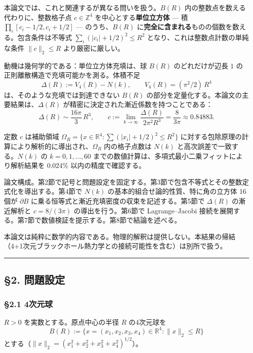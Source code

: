 \documentclass[a4paper,11pt]{ltjsarticle}
\theoremstyle{definition}
\begin{document}
本論文では、これと関連するが異なる問いを扱う。\(B(R)\)
内の整数点を数える代わりに、整数格子点 \(c \in \mathbb{Z}^4\)
を中心とする\textbf{単位立方体} --- 積
\(\prod_i [c_i - 1/2, c_i + 1/2]\) --- のうち、\(B(R)\)
に\textbf{完全に含まれる}ものの個数を数える。包含条件は不等式
\(\sum_i (|c_i| + 1/2)^2 \le R^2\) となり、これは整数点計数の単純な条件
\(\|c\|_2 \le R\) より厳密に厳しい。

動機は幾何学的である：単位立方体充填は、球 \(B(R)\) のどれだけが辺長
\(1\) の正則離散構造で充填可能かを測る。体積不足
\[\Delta(R) := V_4(R) - N(k), \qquad V_4(R) = (\pi^2/2)\,R^4\]
は、そのような充填では到達できない \(B(R)\)
の部分を定量化する。本論文の主要結果は、\(\Delta(R)\)
が精密に決定された漸近係数を持つことである：
\[\Delta(R) \sim \frac{16\pi}{3}\,R^3, \qquad c := \lim_{k\to\infty} \frac{\Delta(R)}{2\pi^2 R^3} = \frac{8}{3\pi} \approx 0.84883.\]

定数 \(c\) は補助領域
\(\Omega_R = \{x \in \mathbb{R}^4 : \sum (|x_i|+1/2)^2 \le R^2\}\)
に対する包除原理の計算により解析的に導出され、\(\Omega_R\)
内の格子点数は \(N(k)\) と高次誤差で一致する。\(N(k)\) の
\(k = 0, 1, \ldots, 60\)
までの数値計算は、多項式最小二乗フィットにより解析結果を 0.024\%
以内の精度で確認する。

論文構成。第2節で記号と問題設定を固定する。第3節で包含不等式とその整数定式化を導出する。第4節で
\(N(k)\) の基本的組合せ論的性質、特に角の立方体 16 個が \(\partial B\)
に乗る恒等式と漸近充填密度の収束を記述する。第5節で \(\Delta(R)\)
の漸近解析と \(c = 8/(3\pi)\) の導出を行う。第6節で Lagrange--Jacobi
接続を展開する。第7節で数値検証を提示する。第8節で結論を述べる。

本論文は純粋に数学的内容である。物理的解釈は提供しない。本結果の帰結（4+1次元ブラックホール熱力学との接続可能性を含む）は別所で扱う。

\begin{center}\rule{0.5\linewidth}{0.5pt}\end{center}

\subsection{§2. 問題設定}\label{ux554fux984cux8a2dux5b9a}

\subsubsection{§2.1 4次元球}\label{ux6b21ux5143ux7403}

\(R > 0\) を実数とする。原点中心の半径 \(R\) の4次元球を
\[B(R) := \{x = (x_1, x_2, x_3, x_4) \in \mathbb{R}^4 : \|x\|_2 \le R\}\]
とする（\(\|x\|_2 = (x_1^2 + x_2^2 + x_3^2 + x_4^2)^{1/2}\)）。
\end{document}
